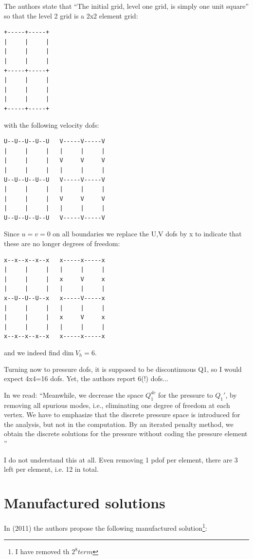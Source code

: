 The authors state that ``The initial grid, level one grid, is simply one unit square''
so that the level 2 grid is a 2x2 element grid:
\begin{verbatim}
+-----+-----+
|     |     |
|     |     |
|     |     |
+-----+-----+
|     |     |
|     |     |
|     |     |
+-----+-----+
\end{verbatim}
with the following velocity dofs:
\begin{verbatim}
U--U--U--U--U   V-----V-----V
|     |     |   |     |     |
|     |     |   V     V     V
|     |     |   |     |     |
U--U--U--U--U   V-----V-----V
|     |     |   |     |     |
|     |     |   V     V     V
|     |     |   |     |     |
U--U--U--U--U   V-----V-----V
\end{verbatim}
Since $u=v=0$ on all boundaries we replace the U,V dofs by x
to indicate that these are no longer degrees of freedom:
\begin{verbatim}
x--x--x--x--x   x-----x-----x
|     |     |   |     |     |
|     |     |   x     V     x
|     |     |   |     |     |
x--U--U--U--x   x-----V-----x
|     |     |   |     |     |
|     |     |   x     V     x
|     |     |   |     |     |
x--x--x--x--x   x-----x-----x
\end{verbatim}
and we indeed find $\text{dim}~V_h=6$. 

Turning now to pressure dofs, it is supposed to be discontinuous Q1, 
so I would expect 4x4=16 dofs. 
Yet, the authors report 6(!) dofs... 

In \cite{huzh11} we read: ``Meanwhile, we decrease the space $Q_1^{dc}$ 
for the pressure to $Q_1'$, by removing all spurious modes, i.e.,
eliminating one degree of freedom at each vertex.
We have to emphasize
that the discrete pressure space is introduced for the analysis, but not in the
computation. By an iterated penalty method, we obtain the discrete solutions
for the pressure without coding the pressure element
''

I do not understand this at all. Even removing 1 pdof per element, there are 3 left
per element, i.e. 12 in total.



\section*{Manufactured solutions}

In \textcite{huzh11} (2011) the authors propose the 
following manufactured solution\footnote{I have removed th $2^8 term$}:

